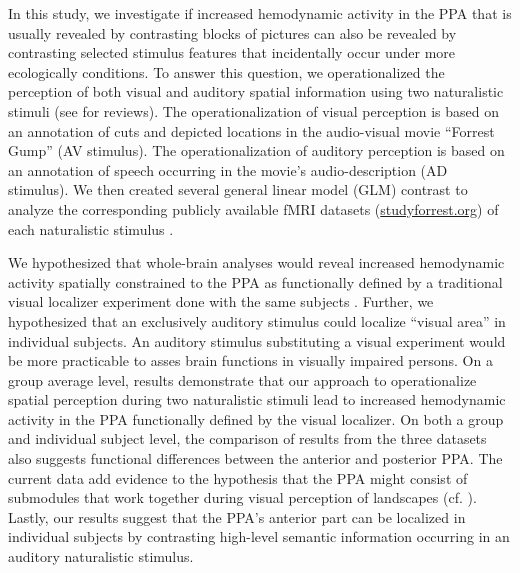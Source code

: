 \documentclass[english]{article}
\begin{document}
In this study, we investigate if increased hemodynamic activity in the PPA that
is usually revealed by contrasting blocks of pictures can also be revealed by
contrasting selected stimulus features that incidentally occur under more
ecologically conditions.
To answer this question, we operationalized the perception of both visual and
auditory spatial information using two naturalistic stimuli (see
\citep{hamilton2018revolution, hasson2008neurocinematics,
sonkusare2019naturalistic} for reviews).
The operationalization of visual perception is based on an annotation of cuts
and depicted locations in the audio-visual movie ``Forrest Gump'' (AV stimulus).
The operationalization of auditory perception is based on an annotation of
speech occurring in the movie's audio-description (AD stimulus).
We then created several general linear model (GLM) contrast to analyze the
corresponding publicly available fMRI datasets
(\href{http://www.studyforrest.org}{studyforrest.org}) of each naturalistic
stimulus \citep{hanke2016simultaneous, hanke2014audiomovie}.

We hypothesized that whole-brain analyses would reveal increased hemodynamic
activity spatially constrained to the PPA as functionally defined by a
traditional visual localizer experiment done with the same subjects
\citep{sengupta2016extension}.
Further, we hypothesized that an exclusively auditory stimulus could localize
``visual area'' in individual subjects.
An auditory stimulus substituting a visual experiment would be more practicable
to asses brain functions in visually impaired persons.
On a group average level,
results demonstrate that our approach to operationalize spatial perception
during two naturalistic stimuli lead to increased hemodynamic activity in the
PPA functionally defined by the visual localizer.
On both a group and individual subject level, the comparison of results from the
three datasets also suggests functional differences between the anterior and
posterior PPA.
The current data add evidence to the hypothesis that the PPA might consist of
submodules that work together during visual perception of landscapes (cf.
\citep{baldassano2013differential}).
%
Lastly, our results suggest that the PPA's anterior part can be localized in
individual subjects by contrasting high-level semantic information occurring in
an auditory naturalistic stimulus.
\end{document}
